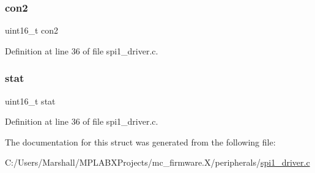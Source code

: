 \subsubsection{\texorpdfstring{con2}{con2}}
{\footnotesize\ttfamily uint16\+\_\+t con2}



Definition at line 36 of file spi1\+\_\+driver.\+c.

\mbox{\label{structspi1__configuration__t_a9ebb6eed90bd90fa99f9cf9e1f6c69fd}} 
\subsubsection{\texorpdfstring{stat}{stat}}
{\footnotesize\ttfamily uint16\+\_\+t stat}



Definition at line 36 of file spi1\+\_\+driver.\+c.



The documentation for this struct was generated from the following file\+:\begin{DoxyCompactItemize}
\item 
C\+:/\+Users/\+Marshall/\+M\+P\+L\+A\+B\+X\+Projects/mc\+\_\+firmware.\+X/peripherals/\mbox{\hyperlink{spi1__driver_8c}{spi1\+\_\+driver.\+c}}\end{DoxyCompactItemize}
